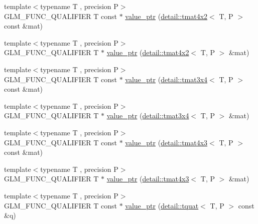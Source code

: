\begin{DoxyCompactItemize}
\item 
{\footnotesize template$<$typename T , precision P$>$ }\\G\+L\+M\+\_\+\+F\+U\+N\+C\+\_\+\+Q\+U\+A\+L\+I\+F\+I\+ER T const $\ast$ \hyperlink{group__gtc__type__ptr_ga73acc0dbfeeb9e6c09df1f79fd990b84}{value\+\_\+ptr} (\hyperlink{structglm_1_1detail_1_1tmat4x2}{detail\+::tmat4x2}$<$ T, P $>$ const \&mat)
\item 
{\footnotesize template$<$typename T , precision P$>$ }\\G\+L\+M\+\_\+\+F\+U\+N\+C\+\_\+\+Q\+U\+A\+L\+I\+F\+I\+ER T $\ast$ \hyperlink{group__gtc__type__ptr_ga478c7dc470b36836ac5392e852fd2348}{value\+\_\+ptr} (\hyperlink{structglm_1_1detail_1_1tmat4x2}{detail\+::tmat4x2}$<$ T, P $>$ \&mat)
\item 
{\footnotesize template$<$typename T , precision P$>$ }\\G\+L\+M\+\_\+\+F\+U\+N\+C\+\_\+\+Q\+U\+A\+L\+I\+F\+I\+ER T const $\ast$ \hyperlink{group__gtc__type__ptr_ga233effe326542ae9657b8feac80e541f}{value\+\_\+ptr} (\hyperlink{structglm_1_1detail_1_1tmat3x4}{detail\+::tmat3x4}$<$ T, P $>$ const \&mat)
\item 
{\footnotesize template$<$typename T , precision P$>$ }\\G\+L\+M\+\_\+\+F\+U\+N\+C\+\_\+\+Q\+U\+A\+L\+I\+F\+I\+ER T $\ast$ \hyperlink{group__gtc__type__ptr_gad8c6b1dbda2b48d19fd1bc8b01cf701c}{value\+\_\+ptr} (\hyperlink{structglm_1_1detail_1_1tmat3x4}{detail\+::tmat3x4}$<$ T, P $>$ \&mat)
\item 
{\footnotesize template$<$typename T , precision P$>$ }\\G\+L\+M\+\_\+\+F\+U\+N\+C\+\_\+\+Q\+U\+A\+L\+I\+F\+I\+ER T const $\ast$ \hyperlink{group__gtc__type__ptr_gaebe5b66d8b05f6ace85d26cedd03732d}{value\+\_\+ptr} (\hyperlink{structglm_1_1detail_1_1tmat4x3}{detail\+::tmat4x3}$<$ T, P $>$ const \&mat)
\item 
{\footnotesize template$<$typename T , precision P$>$ }\\G\+L\+M\+\_\+\+F\+U\+N\+C\+\_\+\+Q\+U\+A\+L\+I\+F\+I\+ER T $\ast$ \hyperlink{group__gtc__type__ptr_ga4a4b23867cc26441441ff4458844fa27}{value\+\_\+ptr} (\hyperlink{structglm_1_1detail_1_1tmat4x3}{detail\+::tmat4x3}$<$ T, P $>$ \&mat)
\item 
{\footnotesize template$<$typename T , precision P$>$ }\\G\+L\+M\+\_\+\+F\+U\+N\+C\+\_\+\+Q\+U\+A\+L\+I\+F\+I\+ER T const $\ast$ \hyperlink{group__gtc__type__ptr_ga961a5b150a0ffd632aaa0252c4d6b9ab}{value\+\_\+ptr} (\hyperlink{structglm_1_1detail_1_1tquat}{detail\+::tquat}$<$ T, P $>$ const \&q)

\end{DoxyCompactItemize}
